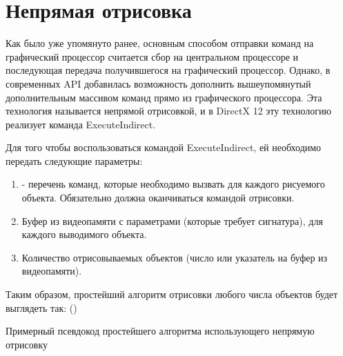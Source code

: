 \section{Непрямая отрисовка} \label{ch3:indirect_draw}
Как было уже упомянуто ранее, основным способом отправки команд на графический процессор считается сбор  на центральном процессоре и последующая передача получившегося  на графический процессор. Однако, в современных API добавилась возможность дополнить вышеупомянутый  дополнительным массивом команд прямо из графического процессора. Эта технология называется непрямой отрисовкой, и в DirectX 12 эту технологию реализует команда ExecuteIndirect. 

Для того чтобы воспользоваться командой ExecuteIndirect, ей необходимо передать следующие параметры:
\begin{enumerate}[1.] 
	\item {} - перечень команд, которые необходимо вызвать для каждого рисуемого объекта. Обязательно должна оканчиваться командой отрисовки.
	\item Буфер из видеопамяти с параметрами (которые требует сигнатура), для каждого выводимого объекта.
	\item Количество отрисовываемых объектов (число или указатель на буфер из видеопамяти).
\end{enumerate}

Таким образом, простейший алгоритм отрисовки любого числа объектов будет выглядеть так: ()

\begin{algorithm} %
	\nonl{}
	\caption{Примерный псевдокод простейшего алгоритма использующего непрямую отрисовку}\label{alg:simpleIndirect}
\end{algorithm}
\FloatBarrier

